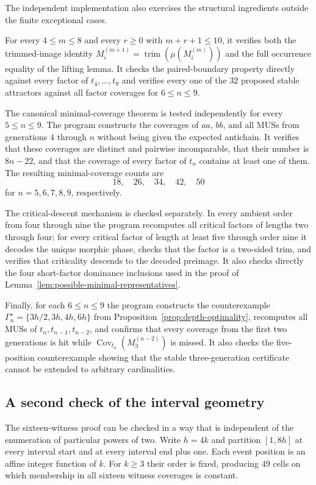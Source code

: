 \documentclass[10pt,a4paper]{article}
\theoremstyle{definition}\newtheorem{definition}[theorem]{Definition}
\theoremstyle{remark}\newtheorem{remark}[theorem]{Remark}
\newcommand{\Cov}{\operatorname{Cov}}
\begin{document}
The independent implementation also exercises the structural ingredients outside the finite exceptional cases.

For every $4\le m\le8$ and every $r\ge0$ with $m+r+1\le10$, it verifies both the trimmed-image identity
$
 M_i^{(m+1)}=\operatorname{trim}(\mu(M_i^{(m)}))
$
and the full occurrence equality of the lifting lemma.  It checks the paired-boundary property directly against every factor of $t_4,\ldots,t_9$ and verifies every one of the $32$ proposed stable attractors against all factor coverages for $6\le n\le9$.

The canonical minimal-coverage theorem is tested independently for every $5\le n\le9$.  The program constructs the coverages of $aa$, $bb$, and all MUSs from generations $4$ through $n$ without being given the expected antichain.  It verifies that these coverages are distinct and pairwise incomparable, that their number is $8n-22$, and that the coverage of every factor of $t_n$ contains at least one of them.  The resulting minimal-coverage counts are
\[
 18,\quad26,\quad34,\quad42,\quad50
\]
for $n=5,6,7,8,9$, respectively.

The critical-descent mechanism is checked separately.  In every ambient order from four through nine the program recomputes all critical factors of lengths two through four; for every critical factor of length at least five through order nine it decodes the unique morphic phase, checks that the factor is a two-sided trim, and verifies that criticality descends to the decoded preimage.  It also checks directly the four short-factor dominance inclusions used in the proof of Lemma~\ref{lem:possible-minimal-representatives}.

Finally, for each $6\le n\le9$ the program constructs the counterexample
$
 \Gamma_n^\star=\{3h/2,3h,4h,6h\}
$
from Proposition~\ref{prop:depth-optimality}, recomputes all MUSs of $t_n,t_{n-1},t_{n-2}$, and confirms that every coverage from the first two generations is hit while $\Cov_{t_n}(M_3^{(n-2)})$ is missed.  It also checks the five-position counterexample showing that the stable three-generation certificate cannot be extended to arbitrary cardinalities.

\subsection{A second check of the interval geometry}
\label{subsec:parametric-check}

The sixteen-witness proof can be checked in a way that is independent of the enumeration of particular powers of two.  Write $h=4k$ and partition $[1,8h]$ at every interval start and at every interval end plus one.  Each event position is an affine integer function of $k$.  For $k\ge3$ their order is fixed, producing $49$ cells on which membership in all sixteen witness coverages is constant.
\end{document}
